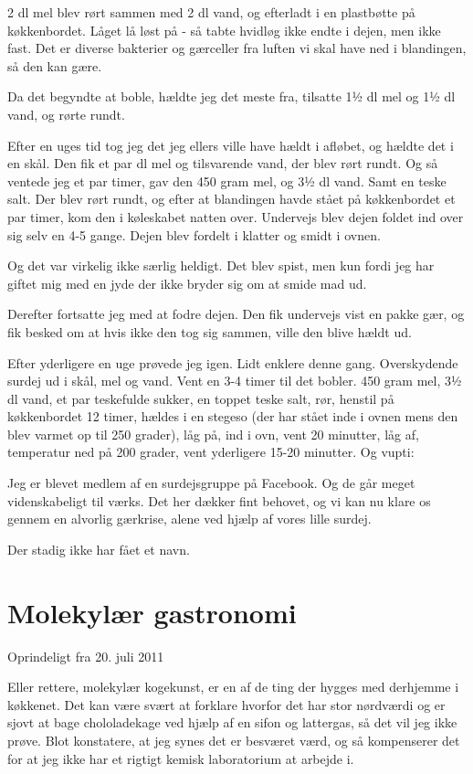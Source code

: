 \documentclass[
  letterpaper,
  DIV=11,
  numbers=noendperiod]{scrreprt}
\begin{document}
2 dl mel blev rørt sammen med 2 dl vand, og efterladt i en plastbøtte på
køkkenbordet. Låget lå løst på - så tabte hvidløg ikke endte i dejen,
men ikke fast. Det er diverse bakterier og gærceller fra luften vi skal
have ned i blandingen, så den kan gære.

Da det begyndte at boble, hældte jeg det meste fra, tilsatte 1½ dl mel
og 1½ dl vand, og rørte rundt.

Efter en uges tid tog jeg det jeg ellers ville have hældt i afløbet, og
hældte det i en skål. Den fik et par dl mel og tilsvarende vand, der
blev rørt rundt. Og så ventede jeg et par timer, gav den 450 gram mel,
og 3½ dl vand. Samt en teske salt. Der blev rørt rundt, og efter at
blandingen havde stået på køkkenbordet et par timer, kom den i
køleskabet natten over. Undervejs blev dejen foldet ind over sig selv en
4-5 gange. Dejen blev fordelt i klatter og smidt i ovnen.

Og det var virkelig ikke særlig heldigt. Det blev spist, men kun fordi
jeg har giftet mig med en jyde der ikke bryder sig om at smide mad ud.

Derefter fortsatte jeg med at fodre dejen. Den fik undervejs vist en
pakke gær, og fik besked om at hvis ikke den tog sig sammen, ville den
blive hældt ud.

Efter yderligere en uge prøvede jeg igen. Lidt enklere denne gang.
Overskydende surdej ud i skål, mel og vand. Vent en 3-4 timer til det
bobler. 450 gram mel, 3½ dl vand, et par teskefulde sukker, en toppet
teske salt, rør, henstil på køkkenbordet 12 timer, hældes i en stegeso
(der har stået inde i ovnen mens den blev varmet op til 250 grader), låg
på, ind i ovn, vent 20 minutter, låg af, temperatur ned på 200 grader,
vent yderligere 15-20 minutter. Og vupti:

Jeg er blevet medlem af en surdejsgruppe på Facebook. Og de går meget
videnskabeligt til værks. Det her dækker fint behovet, og vi kan nu
klare os gennem en alvorlig gærkrise, alene ved hjælp af vores lille
surdej.

Der stadig ikke har fået et navn.

\hypertarget{molekyluxe6r-gastronomi}{%
\section{Molekylær gastronomi}\label{molekyluxe6r-gastronomi}}

Oprindeligt fra 20. juli 2011

Eller rettere, molekylær kogekunst, er en af de ting der hygges med
derhjemme i køkkenet. Det kan være svært at forklare hvorfor det har
stor nørdværdi og er sjovt at bage chololadekage ved hjælp af en sifon
og lattergas, så det vil jeg ikke prøve. Blot konstatere, at jeg synes
det er besværet værd, og så kompenserer det for at jeg ikke har et
rigtigt kemisk laboratorium at arbejde i.
\end{document}

